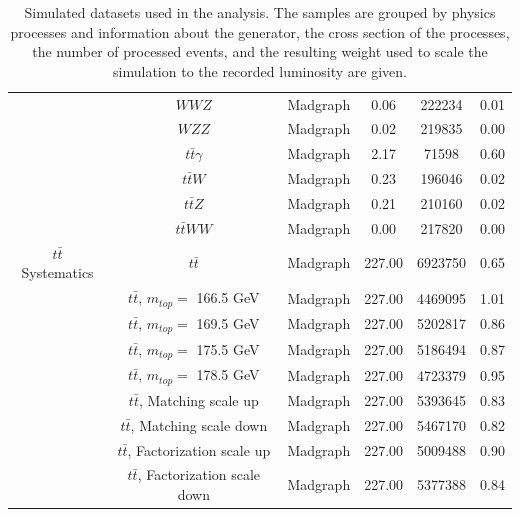 \begin{table}
\begin{center}
\begin{tabular}{c|c|c|c|c|c}
 & $WWZ$ & Madgraph & 0.06 & 222234 & 0.01 \\
 & $WZZ$ & Madgraph & 0.02 & 219835 & 0.00 \\
 & $t\bar{t}\gamma$ & Madgraph & 2.17 & 71598 & 0.60 \\
 & $t\bar{t}W$ & Madgraph & 0.23 & 196046 & 0.02 \\
 & $t\bar{t}Z$ & Madgraph & 0.21 & 210160 & 0.02 \\
 & $t\bar{t}WW$ & Madgraph & 0.00 & 217820 & 0.00 \\
\hline 
$t\bar{t}$ Systematics & $t\bar{t}$ & Madgraph & 227.00 & 6923750 & 0.65 \\
 & $t\bar{t}$, $m_{top} =$ 166.5 GeV & Madgraph & 227.00 & 4469095 & 1.01 \\
 & $t\bar{t}$, $m_{top} =$ 169.5 GeV & Madgraph & 227.00 & 5202817 & 0.86 \\
 & $t\bar{t}$, $m_{top} =$ 175.5 GeV & Madgraph & 227.00 & 5186494 & 0.87 \\
 & $t\bar{t}$, $m_{top} =$ 178.5 GeV & Madgraph & 227.00 & 4723379 & 0.95 \\
 & $t\bar{t}$, Matching scale up & Madgraph & 227.00 & 5393645 & 0.83 \\
 & $t\bar{t}$, Matching scale down & Madgraph & 227.00 & 5467170 & 0.82 \\
 & $t\bar{t}$, Factorization scale up & Madgraph & 227.00 & 5009488 & 0.90 \\
 & $t\bar{t}$, Factorization scale down & Madgraph & 227.00 & 5377388 & 0.84 \\

\end{tabular}
\caption{Simulated datasets used in the analysis. The samples are grouped by physics processes and information about the generator, the cross section of the processes, the number of processed events, and the resulting weight used to scale the simulation to the recorded luminosity are given.}
\label{tab:MCSamples}
\end{center}
\end{table}

